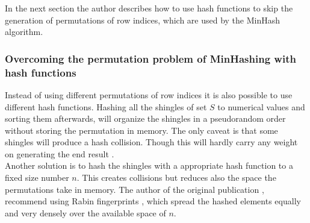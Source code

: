 In the next section the author describes how to use hash functions to skip the generation of permutations of row indices, which are used by the MinHash algorithm.\\

\subsubsection{Overcoming the permutation problem of MinHashing with hash functions} Instead of using different permutations of row indices it is also possible to use different hash functions. Hashing all the shingles of set $ S $ to numerical values and sorting them afterwards, will organize the shingles in a pseudorandom order without storing the permutation in memory. The only caveat is that some shingles will produce a hash collision. Though this will hardly carry any weight on generating the end result \cite{minhash}.\\

Another solution is to hash the shingles with a appropriate hash function to a fixed size number $ n $. This creates collisions but reduces also the space the permutations take in memory. The author of the original publication \cite{minhash}, recommend using Rabin fingerprints \cite{rabinFingerprinting}, which spread the hashed elements equally and very densely over the available space of $ n $.\\